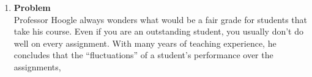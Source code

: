 \documentclass[12pt]{article}
\newenvironment{Ex}{\textbf{Problem}\vspace{.75em}\\}{}
\begin{document}
\begin{enumerate}
\begin{Ex}
\begin{solution}
\begin{enumerate}
\begin{table}[H]
\begin{tabularx}{\linewidth}{XX}
\begin{equation}
\begin{aligned}
              \end{aligned}
            \end{equation}
            &
            \begin{equation}
              \label{eq:5a-var-x}
              \begin{aligned}
                \text{Var}(X) &= \text{Var}(n X_1) \\
                \implies \sigma_{X_i}^2 &= 62400 \\
              \end{aligned}
            \end{equation}
          \end{tabularx}
        \end{table}

        The confidence interval then becomes
        \begin{equation}
          \label{eq:5a-sol}
          \begin{aligned}
            \left[260 - 1.96\sqrt{\frac{\sigma_X^2}{n}}&, 260 +
            1.96\sqrt{\frac{\sigma_X^2}{n}}\right] \\
            \implies [238.104&, 281.896] \\
          \end{aligned}
        \end{equation}
      \item Repeating the above with the altered probabilities yeilds
        \begin{equation}
          \label{eq:5b-sol}
          \begin{aligned}
            \left[25 - 1.96\sqrt{\frac{\sigma_X^2}{n}}&, 25 +
            1.96\sqrt{\frac{\sigma_X^2}{n}}\right] \\
            \implies [15.4481&, 35.5519] \\
          \end{aligned}
        \end{equation}
      \end{enumerate}
    \end{solution}
  \end{Ex}
\item
  \begin{Ex}
    Professor Hoogle always wonders what would be a fair grade for
    students that take his course. Even if you are an outstanding
    student, you usually don’t do well on every assignment. With many
    years of teaching experience, he concludes that the
    ``fluctuations'' of a student’s performance over the assignments,

\end{Ex}
\end{enumerate}
\end{document}
